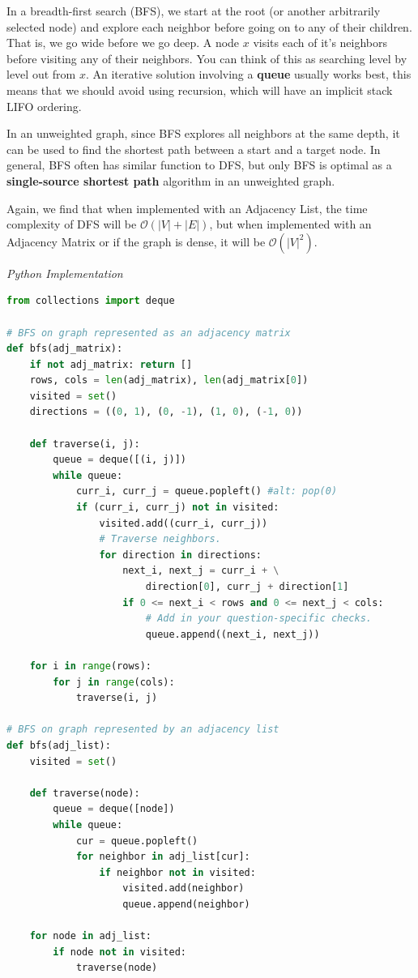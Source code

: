 \documentclass{article}
\newcommand{\bigO}{\mathcal{O}}
\begin{document}
    In a breadth-first search (BFS), we start at the root (or another arbitrarily selected node) and explore each neighbor before going on to any of their children. That is, we go wide before we go deep. A node $x$ visits each of it's neighbors before visiting any of their neighbors. You can think of this as searching level by level out from $x$. An iterative solution involving a \textbf{queue} usually works best, this means that we should avoid using recursion, which will have an implicit stack LIFO ordering.
    
    In an unweighted graph, since BFS explores all neighbors at the same depth, it can be used to find the shortest path between a start and a target node. In general, BFS often has similar function to DFS, but only BFS is optimal as a \textbf{single-source shortest path} algorithm in an unweighted graph.

    Again, we find that when implemented with an Adjacency List, the time complexity of DFS will be $\bigO(|V| + |E|)$, but when implemented with an Adjacency Matrix or if the graph is dense, it will be $\bigO(|V|^2)$.
    
\vspace{8pt} \emph{Python Implementation}
\begin{lstlisting}[language=Python]
from collections import deque

# BFS on graph represented as an adjacency matrix
def bfs(adj_matrix):
    if not adj_matrix: return []
    rows, cols = len(adj_matrix), len(adj_matrix[0])
    visited = set()
    directions = ((0, 1), (0, -1), (1, 0), (-1, 0))

    def traverse(i, j):
        queue = deque([(i, j)])
        while queue:
            curr_i, curr_j = queue.popleft() #alt: pop(0)
            if (curr_i, curr_j) not in visited:
                visited.add((curr_i, curr_j))
                # Traverse neighbors.
                for direction in directions:
                    next_i, next_j = curr_i + \
                        direction[0], curr_j + direction[1]
                    if 0 <= next_i < rows and 0 <= next_j < cols:
                        # Add in your question-specific checks.
                        queue.append((next_i, next_j))

    for i in range(rows):
        for j in range(cols):
            traverse(i, j)
            
# BFS on graph represented by an adjacency list 
def bfs(adj_list):
    visited = set()
    
    def traverse(node):
        queue = deque([node])
        while queue:
            cur = queue.popleft()
            for neighbor in adj_list[cur]:
                if neighbor not in visited:
                    visited.add(neighbor)
                    queue.append(neighbor)
                    
    for node in adj_list:
        if node not in visited:
            traverse(node)
\end{lstlisting}
\end{document}
